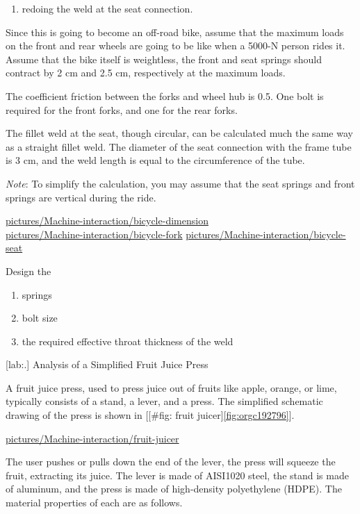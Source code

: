 \documentclass[a4paper,openany,12pt]{book}
\begin{document}
{{\begin{enumerate}
\item redoing the weld at the seat connection.
\end{enumerate}

Since this is going to become an off-road bike, assume that the maximum
loads on the front and rear wheels are going to be like when a 5000-N
person rides it. Assume that the bike itself is weightless, the front
and seat springs should contract by 2 cm and 2.5 cm, respectively at the
maximum loads.

The coefficient friction between the forks and wheel hub is 0.5. One
bolt is required for the front forks, and one for the rear forks.

The fillet weld at the seat, though circular, can be calculated much the
same way as a straight fillet weld. The diameter of the seat connection
with the frame tube is 3 cm, and the weld length is equal to the
circumference of the tube.

\emph{Note}: To simplify the calculation, you may assume that the seat
springs and front springs are vertical during the ride.

\url{pictures/Machine-interaction/bicycle-dimension}\\
\url{pictures/Machine-interaction/bicycle-fork}
\url{pictures/Machine-interaction/bicycle-seat}

Design the

\begin{enumerate}
\item springs

\item bolt size

\item the required effective throat thickness of the weld
\end{enumerate}

[lab:.]
Analysis of a Simplified Fruit Juice Press

A fruit juice press, used to press juice out of fruits like apple,
orange, or lime, typically consists of a stand, a lever, and a press.
The simplified schematic drawing of the press is shown in
[[\#fig: fruit juicer]\ref{fig:orgc192796}].


\url{pictures/Machine-interaction/fruit-juicer}

The user pushes or pulls down the end of the lever, the press will
squeeze the fruit, extracting its juice. The lever is made of AISI1020
steel, the stand is made of aluminum, and the press is made of
high-density polyethylene (HDPE). The material properties of each are as
follows.


}}
\end{document}
